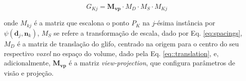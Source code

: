\begin{equation}
    G_{Kj} = \mathbf{M_{vp}}\cdot M_D \cdot M_S \cdot M_{Kj}
\end{equation}

onde $M_{kj}$ é a matriz que escalona o ponto $P_K$ na $j$-ésima instância por $\psi(\mathbf{d}_j, \mathbf{n}_k)$, $M_S$ se refere a transformação de escala, dado por Eq. \ref{eq:spacings}, $M_D$ é a matriz de translação do glifo, centrado na origem para o centro do seu respectivo \textit{voxel} no espaço do volume, dado pela Eq. \ref{eq::translation}, e, adicionalmente, $\mathbf{M_{vp}}$ é a matriz \textit{view-projection}, que configura parâmetros de visão e projeção.
